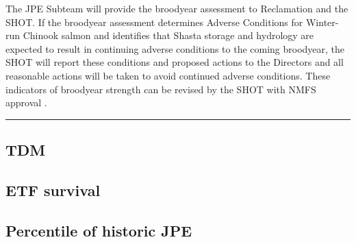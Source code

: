 \documentclass[
]{book}
\theoremstyle{definition}
\theoremstyle{definition}
\theoremstyle{definition}
\theoremstyle{definition}
\theoremstyle{remark}
\begin{document}
The JPE Subteam will provide the broodyear assessment to Reclamation and the SHOT. If the broodyear assessment determines Adverse Conditions for Winter-run Chinook salmon and identifies that Shasta storage and hydrology are expected to result in continuing adverse conditions to the coming broodyear, the SHOT will report these conditions and proposed actions to the Directors and all reasonable actions will be taken to avoid continued adverse conditions. These indicators of broodyear strength can be revised by the SHOT with NMFS approval .

\begin{center}\rule{0.5\linewidth}{0.5pt}\end{center}

\hypertarget{tdm}{%
\subsection{TDM}\label{tdm}}

\hypertarget{etf-survival}{%
\subsection{ETF survival}\label{etf-survival}}

\hypertarget{percentile-of-historic-jpe}{%
\subsection{Percentile of historic JPE}\label{percentile-of-historic-jpe}}

  
\end{document}
